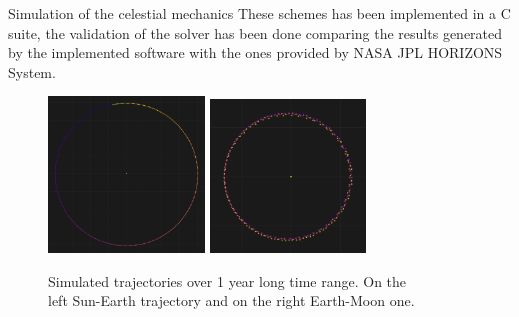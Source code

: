 \documentclass[final]{beamer}
\newlength{\onecolwid}
\begin{document}
\begin{frame}[t]
\begin{columns}[t]
\begin{column}{\onecolwid}
\begin{block}{Simulation of the celestial mechanics}
These schemes has been implemented in a C suite, the validation of the solver
has been done comparing the results generated by the implemented software with
the ones provided by NASA JPL HORIZONS System.
\begin{figure}
  \small
  \begin{center}
    \includegraphics[width=0.37\textwidth]{images/three_bodies_sun_earth.png}
    \hspace{1em}
    \includegraphics[width=0.37\textwidth]{images/three_bodies_earth_moon.png}
  \end{center}

  Simulated trajectories over 1 year long time range. On the \\
  left Sun-Earth trajectory and on the right Earth-Moon one.
\end{figure}
\end{block}


\end{column}
\end{columns}
\end{frame}
\end{document}
